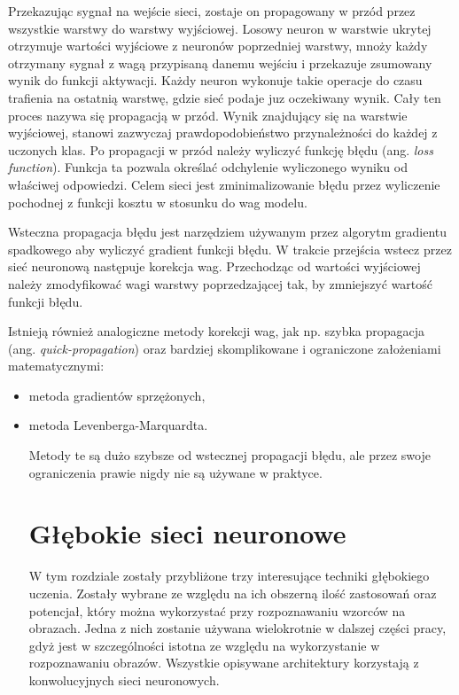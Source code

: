 \documentclass[12pt,a4paper,twoside,titlepage,openright]{book}
\begin{document}
\begin{itemize}
Przekazując sygnał na wejście sieci, zostaje on propagowany w przód przez wszystkie warstwy do warstwy wyjściowej. Losowy neuron w warstwie ukrytej otrzymuje wartości wyjściowe z neuronów poprzedniej warstwy, mnoży każdy otrzymany sygnał z wagą przypisaną danemu wejściu i przekazuje zsumowany wynik do funkcji aktywacji. Każdy neuron wykonuje takie operacje do czasu trafienia na ostatnią warstwę, gdzie sieć podaje juz oczekiwany wynik. Cały ten proces nazywa się propagacją w przód. Wynik znajdujący się na warstwie wyjściowej, stanowi zazwyczaj prawdopodobieństwo przynależności do każdej z uczonych klas. Po propagacji w przód należy wyliczyć funkcję błędu (ang. \textit{loss function}). Funkcja ta pozwala określać odchylenie wyliczonego wyniku od właściwej odpowiedzi. Celem sieci jest zminimalizowanie błędu przez wyliczenie pochodnej z funkcji kosztu w stosunku do wag modelu.

Wsteczna propagacja błędu jest narzędziem używanym przez algorytm gradientu spadkowego aby wyliczyć gradient funkcji błędu. W trakcie przejścia wstecz przez sieć neuronową następuje korekcja wag. Przechodząc od wartości wyjściowej należy zmodyfikować wagi warstwy poprzedzającej tak, by zmniejszyć wartość funkcji błędu.

Istnieją również analogiczne metody korekcji wag, jak np. szybka propagacja (ang. \textit{quick-propagation}) oraz bardziej skomplikowane i ograniczone założeniami matematycznymi: 
\begin{itemize}
\item metoda gradientów sprzężonych, 
\item metoda Levenberga-Marquardta. 

Metody te są dużo szybsze od wstecznej propagacji błędu, ale przez swoje ograniczenia prawie nigdy nie są używane w praktyce.\cite{odkrywanieSieci}


\chapter{Głębokie sieci neuronowe}
W tym rozdziale zostały przybliżone trzy interesujące techniki głębokiego uczenia. Zostały wybrane ze względu na ich obszerną ilość zastosowań oraz potencjał, który można wykorzystać przy rozpoznawaniu wzorców na obrazach. Jedna z nich zostanie używana wielokrotnie w dalszej części pracy, gdyż jest w szczególności istotna ze względu na wykorzystanie w rozpoznawaniu obrazów. Wszystkie opisywane architektury korzystają z konwolucyjnych sieci neuronowych.

\end{itemize}
\end{itemize}
\end{document}
